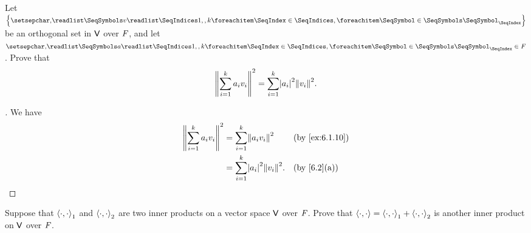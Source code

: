 \begin{ex}\label{ex:6.1.12}
	Let \(\set{\seq{v}{1,,k}}\) be an orthogonal set in \(\mathsf{V}\) over \(\mathit{F}\), and let \(\seq{a}{1,,k} \in \F\).
	Prove that
	\[
		\norm{\sum_{i = 1}^k a_i v_i}^2 = \sum_{i = 1}^k \abs{a_i}^2 \norm{v_i}^2.
	\]
\end{ex}

\begin{proof}[]
	We have
	\begin{align*}
		\norm{\sum_{i = 1}^k a_i v_i}^2 & = \sum_{i = 1}^k \norm{a_i v_i}^2          &  & \by{ex:6.1.10} \\
		                                & = \sum_{i = 1}^k \abs{a_i}^2 \norm{v_i}^2. &  & \by{6.2}[a]
	\end{align*}
\end{proof}

\begin{ex}\label{ex:6.1.13}
	Suppose that \(\left\langle\cdot, \cdot\right\rangle_1\) and \(\left\langle\cdot, \cdot\right\rangle_2\) are two inner products on a vector space \(\mathsf{V}\) over \(\mathit{F}\).
	Prove that \(\left\langle\cdot, \cdot\right\rangle = \left\langle\cdot, \cdot\right\rangle_1 + \left\langle\cdot, \cdot\right\rangle_2\) is another inner product on \(\mathsf{V}\) over \(\mathit{F}\).
\end{ex}

